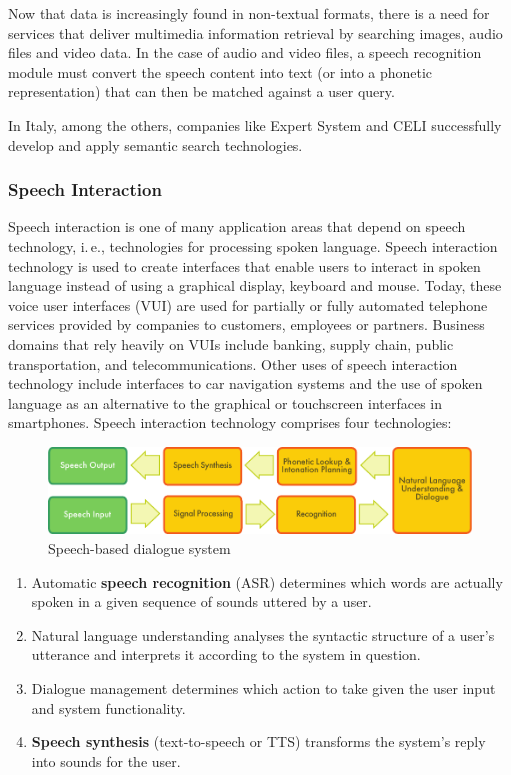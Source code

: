 \begin{multicols}{2}
Now that data is increasingly found in non-textual formats, there is a need
for services that deliver multimedia information retrieval by searching
images, audio files and video data. In the case of audio and video files, a
speech recognition module must convert the speech content into text (or into a
phonetic representation) that can then be matched against a user query.

In Italy, among the others, companies like Expert System and CELI successfully develop and apply semantic search technologies.


\subsubsection{Speech Interaction}


Speech interaction is one of many application areas that depend on
speech technology, i.\,e., technologies for processing spoken
language. Speech interaction technology is used to create interfaces
that enable users to interact in spoken language instead of using a
graphical display, keyboard and mouse.  Today, these voice user
interfaces (VUI) are used for partially or fully automated telephone
services provided by companies to customers, employees or
partners. Business domains that rely heavily on VUIs include banking,
supply chain, public transportation, and telecommunications. Other
uses of speech interaction technology include interfaces to car
navigation systems and the use of spoken language as an alternative to
the graphical or touchscreen interfaces in smartphones. Speech
interaction technology comprises four technologies:


\begin{figure}[htb]
  \center
  \includegraphics[width=\textwidth]{../_media/english/simple_speech-based_dialogue_architecture}
  \caption{Speech-based dialogue system}
  \label{fig:dialoguearch_en}
\end{figure}


\begin{enumerate}
\item Automatic \textbf{speech recognition} (ASR) determines which words are actually spoken in a given sequence of sounds uttered by a user.
\item Natural language understanding analyses the syntactic structure of a user's utterance and interprets it according to the system in question.
\item Dialogue management determines which action to take given the user input and system functionality.
\item \textbf{Speech synthesis} (text-to-speech or TTS) transforms the
  system's reply into sounds for the user.
\end{enumerate}


\end{multicols}
